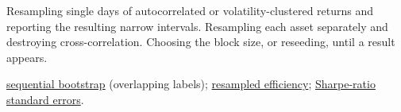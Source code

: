 \begin{qfmethod}
 Resampling single days of autocorrelated or volatility-clustered returns and reporting the resulting narrow intervals. Resampling each asset separately and destroying cross-correlation. Choosing the block size, or reseeding, until a result appears.

 \hyperref[meth:sequential-bootstrap]{sequential bootstrap} (overlapping labels); \hyperref[meth:resampled-efficiency]{resampled efficiency}; \hyperref[meth:sharpe-ratio-standard-error]{Sharpe-ratio standard errors}.

\end{qfmethod}
